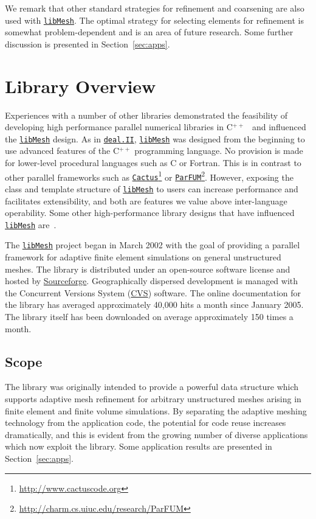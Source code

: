 \documentclass[global,twocolumn,final]{svjour}
\newcommand{\libMesh}{\href{http://libmesh.sourceforge.net}{\texttt{lib\-Mesh}}}
\newcommand{\dealII}{\href{http://www.dealii.org}{\texttt{deal.\-II}}}
\newcommand{\CVS}{\href{http://www.nongnu.org/cvs}{CVS}}
\newcommand{\Sourceforge}{\href{http://www.sourceforge.net}{Sourceforge}}
\newcommand{\ParFUM}{\href{http://charm.cs.uiuc.edu/research/ParFUM}{\texttt{ParFUM}}}
\newcommand{\Cactus}{\href{http://www.cactuscode.org}{\texttt{Cactus}}}
\newcommand{\cpp}{C{\tiny$^{++}$}}
\begin{document}
We remark that other standard strategies for refinement and coarsening
are also used with \libMesh.
The optimal strategy for selecting elements for
refinement is somewhat problem-dependent and is an area of future
research.  Some further discussion is presented in
Section~\ref{sec:apps}.


\section{Library Overview}
Experiences with a number of other
libraries demonstrated the feasibility of
developing high performance parallel numerical libraries in
\cpp{}~\cite{Ban00i,Alegra,scientific_engineering_cpp} and influenced
the \libMesh{} design.  As in \dealII{}, \libMesh{} was designed from
the beginning to use advanced features of the \cpp{} programming
language.  No provision is made for lower-level procedural languages
such as C or Fortran.  This is in contrast to other parallel
frameworks such as \Cactus{}\footnote{\url{http://www.cactuscode.org}}
or \ParFUM{}\footnote{\url{http://charm.cs.uiuc.edu/research/ParFUM}}.
However, exposing the class and template structure of \libMesh{} to
users can increase performance and facilitates extensibility, and both
are features we value above inter-language operability.
Some other high-performance library designs that have influenced
\libMesh{} are~\cite{ug_library,devloo_M2AN,demkowicz_hp}.

The \libMesh{} project began in March 2002 with the goal of providing
a parallel framework for adaptive finite element simulations on
general unstructured meshes.  The library is distributed under an
open-source software license and hosted by
\Sourceforge{}. Geographically dispersed development is ma\-naged with
the Concurrent Versions System (\CVS) software.  The online
documentation for the library has averaged approximately 40,000 hits a
month since January 2005.  The library itself has been downloaded on
average approximately 150 times a month.

\subsection{Scope}
The library was originally intended to provide a powerful
data structure which supports adaptive mesh refinement for
arbitrary unstructured meshes arising in finite element and finite
volume simulations.  By separating the adaptive meshing technology
from the application code, the potential for code reuse increases
dramatically, and this is evident from the growing number of diverse
applications which now exploit the library.  Some application
results are presented in Section~\ref{sec:apps}.
\end{document}

